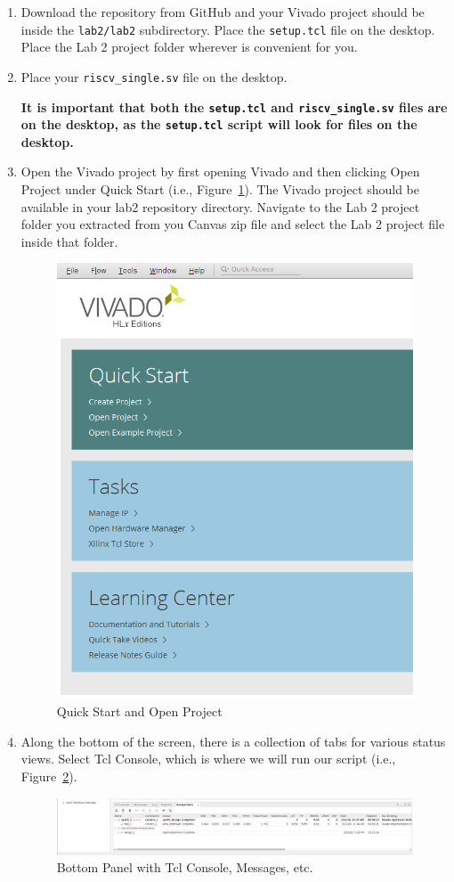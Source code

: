 \documentclass{article}
\begin{document}
\begin{enumerate}
\item Download the repository from GitHub and your Vivado project
  should be inside the \verb|lab2/lab2| subdirectory.  Place the
  \verb|setup.tcl| file on the desktop.  Place the Lab 2 project folder wherever
is convenient for you.

\item Place your \verb|riscv_single.sv| file on the desktop.

\textbf{It is important that both the \texttt{setup.tcl} and
\texttt{riscv\_single.sv} files are on the desktop, as the \texttt{setup.tcl}
script will look for files on the desktop.}

\item Open the Vivado project by first opening Vivado and then clicking Open
  Project under Quick Start (i.e., Figure~\ref{fig:openproject}).
  The Vivado project should be available in your lab2 repository directory.
  Navigate to the Lab 2 project folder
  you extracted from you Canvas zip file and select the Lab 2 project file inside
that folder.
\begin{figure}[h!]
  \centering
  \includegraphics[width=0.4\linewidth]{open_project}
  \caption{Quick Start and Open Project}
  \label{fig:openproject}
\end{figure}

\item Along the bottom of the screen, there is a collection of tabs for various
status views.  Select Tcl Console, which is where we will run our
script (i.e., Figure~\ref{fig:tclconsole}).
\begin{figure}[h!]
  \centering
  \includegraphics[width=1\linewidth]{tcl_console}
  \caption{Bottom Panel with Tcl Console, Messages, etc.}
  \label{fig:tclconsole}
\end{figure}


\end{enumerate}
\end{document}
